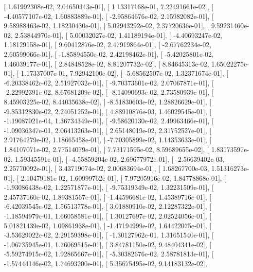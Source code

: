 \documentclass{article}
\begin{document}
       [  1.61992308e-02,   2.04650343e-01],
       [  1.13317168e-01,   7.22491661e-02],
       [ -4.40577107e-02,   1.60883889e-01],
       [ -2.95864676e-02,   2.15982082e-01],
       [  9.58988463e-02,   1.18230430e-01],
       [  5.02943292e-02,   2.37720636e-01],
       [  9.59231460e-02,   2.53844970e-01],
       [  5.00032027e-02,   1.41189194e-01],
       [ -4.40693247e-02,   1.18129158e-01],
       [  9.60412876e-02,   2.47919864e-01],
       [ -2.67762234e-02,   2.60599066e-01],
       [ -1.85894550e-02,   2.42198462e-01],
       [ -5.42025801e-02,   1.46039177e-01],
       [  2.84848528e-02,   8.81207732e-02],
       [  8.84645313e-02,   1.65022275e-01],
       [  1.17337007e-01,   7.92942100e-02],
       [ -5.68562507e-02,   1.32371674e-01],
       [ -6.20338462e-02,   2.51927032e-01],
       [ -9.70373601e-02,   2.07067871e-01],
       [ -2.22992391e-02,   8.67681209e-02],
       [ -8.14090693e-02,   2.73580939e-01],
       [  8.45903225e-02,   8.44035638e-02],
       [ -8.51830603e-02,   1.28826629e-01],
       [ -9.85312830e-02,   2.24051252e-01],
       [  4.88910876e-03,   1.46029545e-01],
       [ -1.19087021e-04,   1.36734349e-01],
       [ -9.58620130e-02,   2.49963466e-01],
       [ -1.09036347e-01,   2.06413263e-01],
       [  2.65148019e-02,   2.31752527e-01],
       [  2.91764279e-02,   1.18665458e-01],
       [ -7.70305899e-02,   1.14353633e-01],
       [  1.84107071e-02,   2.77514079e-01],
       [  7.73171595e-02,   8.59689655e-02],
       [  1.83173597e-02,   1.59345591e-01],
       [ -4.55859204e-02,   2.69677972e-01],
       [ -2.56639402e-03,   2.25770092e-01],
       [  3.43719074e-02,   2.00683694e-01],
       [  1.68267700e-03,   1.51316273e-01],
       [  2.10479181e-02,   1.60999762e-01],
       [  7.97205916e-02,   1.84778868e-01],
       [ -1.93086438e-02,   1.22571877e-01],
       [ -9.75319349e-02,   1.32231509e-01],
       [  2.45737160e-02,   1.89381567e-01],
       [ -1.44596681e-02,   1.45389716e-01],
       [ -6.42039545e-02,   1.56513778e-01],
       [  3.01880910e-02,   2.12287322e-01],
       [ -1.18594979e-01,   1.66058581e-01],
       [  1.30127697e-02,   2.02524056e-01],
       [  5.01821439e-02,   1.09861938e-01],
       [ -1.47194999e-02,   1.64422075e-01],
       [ -3.53629022e-02,   2.29159398e-01],
       [ -1.30127962e-01,   1.31651540e-01],
       [ -1.06735945e-01,   1.76069515e-01],
       [  3.84781150e-02,   9.48404341e-02],
       [ -5.59274915e-02,   1.92865667e-01],
       [ -5.30382676e-02,   2.58781813e-01],
       [ -1.57444146e-02,   1.74693200e-01],
       [  5.35675495e-02,   9.14183132e-02],
\end{document}
